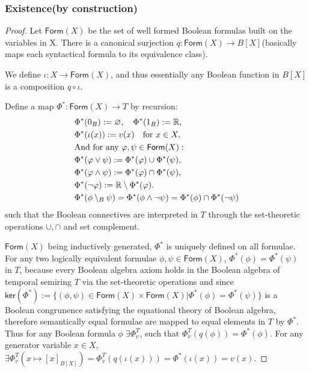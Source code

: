 \subsubsection*{Existence(by construction)}
\begin{proof}
Let $\mathsf{Form}(X)$ be the set of well formed Boolean formulas built on the variables in X. There is a canonical surjection 
$q:\mathsf{Form}(X)\rightarrow B[X]$(basically maps each syntactical formula to its equivalence class).

We define $\iota: X \rightarrow \mathsf{Form}(X)$, and thus essentially any Boolean function in $B[X]$ is a composition $q\circ \iota$.

Define a map $\Phi^*:\mathsf{Form}(X)\rightarrow T$ by recursion:
\begin{align*}
&\Phi^*(0_B) := \varnothing,\quad\Phi^*(1_B) := \mathbb{R},\\
&\Phi^*(\iota(x)) := v(x)\quad\text{for }x\in X,\\
\vspace{2cm}
&\text{And for any }\varphi,\psi \in \mathsf{Form}(X):\\
&\Phi^*(\varphi\vee\psi) := \Phi^*(\varphi)\cup\Phi^*(\psi),\\
&\Phi^*(\varphi\wedge\psi) := \Phi^*(\varphi)\cap\Phi^*(\psi),\\
&\Phi^*(\neg\varphi) := \mathbb{R}\setminus\Phi^*(\varphi).\\
&\Phi^*(\phi \setminus_B \psi) = \Phi^*(\phi \wedge \neg \psi) = \Phi^*(\phi)\cap \Phi^*(\neg \psi)
\end{align*}
such that the Boolean connectives are interpreted in $T$ through the set-theoretic operations $\cup, \cap$ and set complement.

$\mathsf{Form}(X)$ being inductively generated, $\Phi^*$ is uniquely defined on all formulae.
  For any two logically equivalent formulae $\phi, \psi \in \mathsf{Form}(X)$, $\Phi^*(\phi)=\Phi^*(\psi)$ in $T$, because every Boolean algebra axiom holds in 
  the Boolean algebra of temporal semiring $T$ via the set-theoretic operations and since
  $\mathsf{ker}(\Phi^*):=\{(\phi,\psi)\in \mathsf{Form}(X)\times \mathsf{Form}(X)|\Phi^*(\phi)=\Phi^*(\psi)\}$ is a Boolean congrunence satisfying the equational theory of Boolean algebra, 
  therefore semantically equal formulae are mapped to equal elements in $T$ by $\Phi^*$.
  Thus for any Boolean formula $\phi\;\exists \Phi_v^T$, such that $\Phi_v^T(q(\phi))=\Phi^*(\phi)$.
  For any generator variable $x \in X$, $\exists\Phi_v^T(x\mapsto [x]_{B[X]})=\Phi_v^T(q(\iota(x)))=\Phi^*(\iota(x))=v(x)$.

\end{proof}

